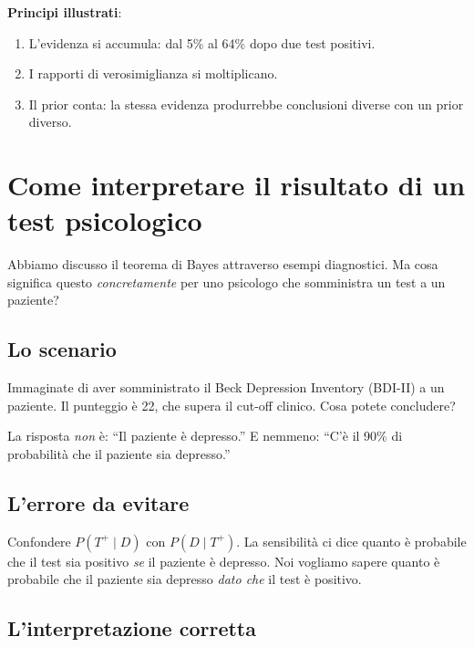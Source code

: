 \documentclass[
  italian,
  letterpaper,
  a4paper,
  11pt,
  open=any]{scrbook}
\providecommand{\tightlist}{%
  \setlength{\itemsep}{0pt}\setlength{\parskip}{0pt}}
\theoremstyle{plain}
\theoremstyle{definition}
\theoremstyle{definition}
\theoremstyle{remark}
\begin{document}
\begin{tcolorbox}
\textbf{Principi illustrati}:

\begin{enumerate}
\def\labelenumi{\arabic{enumi}.}
\tightlist
\item
  L'evidenza si accumula: dal 5\% al 64\% dopo due test positivi.
\item
  I rapporti di verosimiglianza si moltiplicano.
\item
  Il prior conta: la stessa evidenza produrrebbe conclusioni diverse con
  un prior diverso.
\end{enumerate}

\end{tcolorbox}

\section{Come interpretare il risultato di un test
psicologico}\label{sec-interpreting-test-results}

Abbiamo discusso il teorema di Bayes attraverso esempi diagnostici. Ma
cosa significa questo \emph{concretamente} per uno psicologo che
somministra un test a un paziente?

\subsection{Lo scenario}\label{lo-scenario}

Immaginate di aver somministrato il Beck Depression Inventory (BDI-II) a
un paziente. Il punteggio è 22, che supera il cut-off clinico. Cosa
potete concludere?

La risposta \emph{non} è: ``Il paziente è depresso.'' E nemmeno: ``C'è
il 90\% di probabilità che il paziente sia depresso.''

\subsection{L'errore da evitare}\label{lerrore-da-evitare}

Confondere \(P(T^+ \mid D)\) con \(P(D \mid T^+)\). La sensibilità ci
dice quanto è probabile che il test sia positivo \emph{se} il paziente è
depresso. Noi vogliamo sapere quanto è probabile che il paziente sia
depresso \emph{dato che} il test è positivo.

\subsection{L'interpretazione corretta}\label{linterpretazione-corretta}
\end{document}
